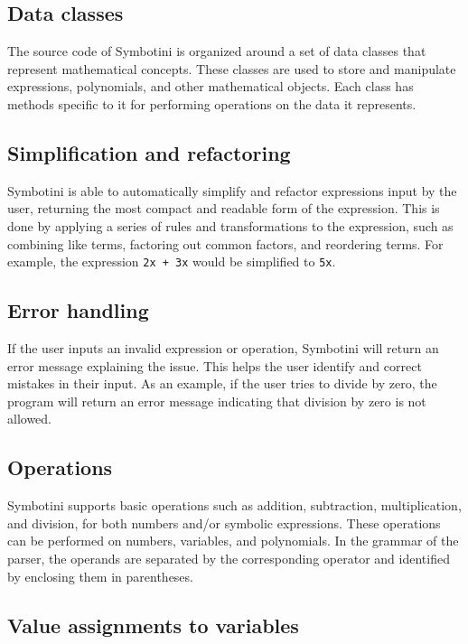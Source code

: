 \subsection{Data classes}\label{subsec:data-classes}

The source code of Symbotini is organized around a set of data classes that represent mathematical concepts. These classes are used to store and manipulate expressions, polynomials, and other mathematical objects. Each class has methods specific to it for performing operations on the data it represents.

\subsection{Simplification and refactoring}\label{subsec:simplification-refactoring}

Symbotini is able to automatically simplify and refactor expressions input by the user, returning the most compact and readable form of the expression. This is done by applying a series of rules and transformations to the expression, such as combining like terms, factoring out common factors, and reordering terms. For example, the expression \verb|2x + 3x| would be simplified to \verb|5x|.

\subsection{Error handling}\label{subsec:error-handling}

If the user inputs an invalid expression or operation, Symbotini will return an error message explaining the issue. This helps the user identify and correct mistakes in their input. As an example, if the user tries to divide by zero, the program will return an error message indicating that division by zero is not allowed.

\subsection{Operations}\label{subsec:arithmetic-operations}

Symbotini supports basic operations such as addition, subtraction, multiplication, and division, for both numbers and/or symbolic expressions. These operations can be performed on numbers, variables, and polynomials. In the grammar of the parser, the operands are separated by the corresponding operator and identified by enclosing them in parentheses.

\subsection{Value assignments to variables}\label{subsec:value-assignments}

